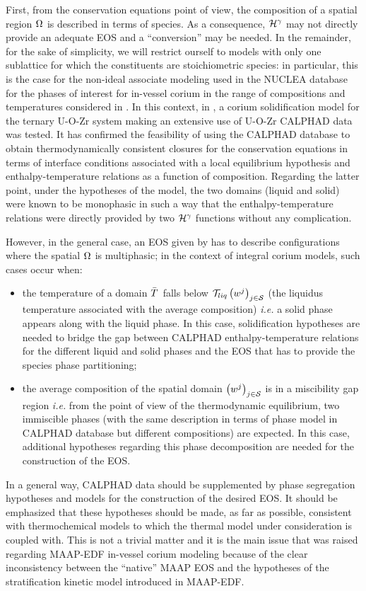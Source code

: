 First, from the conservation equations point of view, the composition of a spatial region $\Omega_{}$ is described in terms of species. As a consequence, ${\mathcal H}^{\gamma}$ may not directly provide an adequate EOS and a ``conversion'' may be needed. In the remainder, for the sake of simplicity, we will restrict ourself to models with only one sublattice for which the constituents are stoichiometric species: in particular, this is the case for the non-ideal associate modeling used in the NUCLEA database \cite{Cheynet2002} for the phases of interest for in-vessel corium in the range of compositions and temperatures considered in . In this context, in \cite{Tiwari2018}, a corium solidification model for the ternary U-O-Zr system making an extensive use of U-O-Zr CALPHAD data was tested. It has confirmed the feasibility of using the CALPHAD database to obtain thermodynamically consistent closures for the conservation equations in terms of interface conditions associated with a local equilibrium hypothesis and enthalpy-temperature relations as a function of composition. Regarding the latter point, under the hypotheses of the model, the two domains (liquid and solid) were known to be monophasic in such a way that the enthalpy-temperature relations were directly provided by two ${\mathcal H}^{\gamma}$ functions without any complication.

However, in the general case, an EOS given by  has to describe configurations where the spatial $\Omega_{}$ is multiphasic; in the context of integral corium models, such cases occur when:
\begin{itemize}
\item the temperature of a domain $\avTemperature{}$ falls below $\Mc{T}_{liq}\left(\massFraction[j]{}\right)_{j\in \speciesSet}$ (the liquidus temperature associated with the average composition) \textit{i.e.} a solid phase appears along with the liquid phase. In this case, solidification hypotheses are needed to bridge the gap between CALPHAD enthalpy-temperature relations for the different liquid and solid phases and the EOS that has to provide the species phase partitioning;
\item the average composition of the spatial domain $\left(\massFraction[j]{}\right)_{j\in \speciesSet}$ is in a miscibility gap region \textit{i.e.} from the point of view of the thermodynamic equilibrium, two immiscible phases (with the same description in terms of phase model in CALPHAD database but different compositions) are expected. In this case, additional hypotheses regarding this phase decomposition are needed for the construction of the EOS.
\end{itemize}
In a general way, CALPHAD data should be supplemented by phase segregation hypotheses and models for the construction of the desired EOS. It should be emphasized that these hypotheses should be made, as far as possible, consistent with thermochemical models to which the thermal model under consideration is coupled with. This is not a trivial matter and it is the main issue that was raised regarding MAAP-EDF in-vessel corium modeling because of the clear inconsistency between the ``native'' MAAP EOS and the hypotheses of the stratification kinetic model introduced in MAAP-EDF. 

